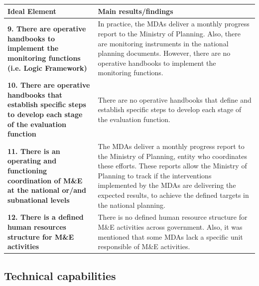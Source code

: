 \documentclass[
  10pt,
]{book}
\begin{document}
\begin{tabu} to 
\hline
Ideal Element & Main results/findings\\
\hline
\textbf{9. There are operative handbooks to implement the monitoring functions (i.e. Logic Framework)} & In practice, the MDAs deliver a monthly progress report to the Ministry of Planning. Also, there are monitoring instruments in the national planning documents. However, there are no operative handbooks to implement the monitoring functions.\\
\hline
\textbf{10. There are operative handbooks that establish specific steps to develop each stage of the evaluation function} & There are no operative handbooks that define and establish specific steps to develop each stage of the evaluation function.\\
\hline
\textbf{11. There is an operating and functioning coordination of M\&E at the national or/and subnational levels} & The MDAs deliver a monthly progress report to the Ministry of Planning, entity who coordinates these efforts. These reports allow the Ministry of Planning to track if the interventions implemented by the MDAs are delivering the expected results, to achieve the defined targets in the national planning.\\
\hline
\textbf{12. There is a defined human resources structure for M\&E activities} & There is no defined human resource structure for M\&E activities across government. Also, it was mentioned that some MDAs lack a specific unit responsible of M\&E activities.\\
\hline
\end{tabu}
\endgroup{}

\hypertarget{technical-capabilities}{%
\subsection{Technical capabilities}\label{technical-capabilities}}
\end{document}
